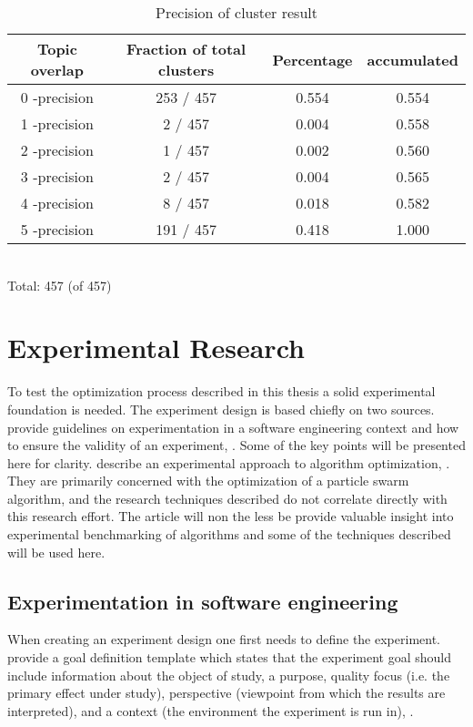 \begin{table}[htdp]
\footnotesize

\begin{center}
\begin{tabular}{|c|c|c|c|}
\hline
Topic overlap &  Fraction of total clusters & Percentage  & accumulated\\ 
\hline
0 -precision & 253 / 457 & 0.554 & 0.554 \\
1 -precision & 2 / 457 & 0.004 & 0.558 \\
2 -precision & 1 / 457 & 0.002 & 0.560\\
3 -precision & 2 / 457 & 0.004 & 0.565\\
4 -precision & 8 / 457 & 0.018 & 0.582\\
5 -precision & 191 / 457 & 0.418 & 1.000\\
\hline
\end{tabular}
\\Total: 457 (of  457)
\end{center}
\caption{Precision of cluster result}
\label{tab:clusterprecision}
\end{table}


\section{Experimental Research}
\label{ExperimentalResearch}
To test the optimization process described in this thesis a solid experimental foundation is needed. The experiment design is based chiefly on two sources.  provide guidelines on experimentation in a software engineering context and how to ensure the validity of an experiment, \parencite{Wohlin2000}. Some of the key points will be presented here for clarity.  describe an experimental approach to algorithm optimization, \parencite{Bartz-Beielstein2004}. They are primarily concerned with the optimization of a particle swarm algorithm, and the research techniques described do not correlate directly with this research effort. The article will non the less be provide valuable insight into experimental benchmarking of algorithms and some of the techniques described will be used here. 

\subsection{Experimentation in software engineering}

When creating an experiment design one first needs to define the experiment. \cite{Wohlin2000} provide a goal definition template which states that the experiment goal should include information about the object of study, a purpose, quality focus (i.e. the primary effect under study), perspective (viewpoint from which the results are interpreted), and a context (the environment the experiment is run in), \parencite{Wohlin2000}.

